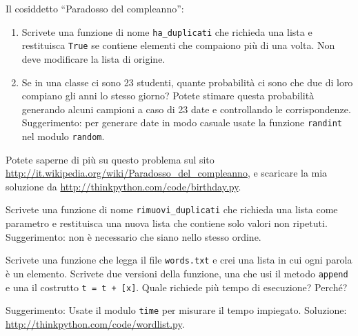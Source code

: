 \documentclass[10pt]{book}
\begin{document}
\vspace{0.2in}
\begin{exercise}
\label{duplicate}

Il cosiddetto ``Paradosso del compleanno'':

\begin{enumerate}

\item Scrivete una funzione di nome \verb"ha_duplicati" che richieda una lista e restituisca {\tt True} se contiene elementi che compaiono più di una volta. Non deve modificare la lista di origine.

\item Se in una classe ci sono 23 studenti, quante probabilità ci sono che due di loro compiano gli anni lo stesso giorno? Potete stimare questa probabilità generando alcuni campioni a caso di 23 date e controllando le corrispondenze. Suggerimento: per generare date in modo casuale usate la funzione {\tt randint} nel modulo {\tt random}.

\end{enumerate}

Potete saperne di più su questo problema sul sito
\url{http://it.wikipedia.org/wiki/Paradosso_del_compleanno}, e scaricare la mia soluzione da  \url{http://thinkpython.com/code/birthday.py}.

\end{exercise}

\vspace{0.2in}
\begin{exercise}

Scrivete una funzione di nome \verb"rimuovi_duplicati" che richieda una lista come parametro e restituisca una nuova lista che contiene solo valori non ripetuti. Suggerimento: non è necessario che siano nello stesso ordine.
\end{exercise}

\vspace{0.2in}
\begin{exercise}

Scrivete una funzione che legga il file {\tt words.txt} e crei una lista in cui ogni parola è un elemento. Scrivete due versioni della funzione, una che usi il metodo {\tt append} e una il costrutto {\tt t = t + [x]}. Quale richiede più tempo di esecuzione? Perché?

Suggerimento: Usate il modulo {\tt time} per misurare il tempo impiegato.
Soluzione: \url{http://thinkpython.com/code/wordlist.py}.

\end{exercise}
\end{document}
